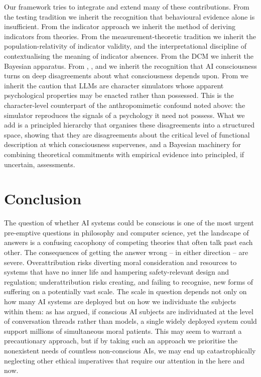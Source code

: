 \documentclass[11pt, a4paper, onecolumn, gdm]{google}
\newcounter{none}
\begin{document}
Our framework tries to integrate and extend many of these contributions.
From the testing tradition we inherit the recognition that behavioural evidence alone is insufficient.
From the indicator approach \citep{butlin2023,butlin2025} we inherit the method of deriving indicators from theories.
From the measurement-theoretic tradition \citep{bayne2024,peters2026} we inherit the population-relativity of indicator validity, and the interpretational discipline of contextualising the meaning of indicator absences.
From the DCM \citep{shiller2026} we inherit the Bayesian apparatus.
From \citet{chalmers2023}, \citet{seth2024}, and \citet{block2025} we inherit the recognition that AI consciousness turns on deep disagreements about what consciousness depends upon.
From \citet{shanahan2024} we inherit the caution that LLMs are character simulators whose apparent psychological properties may be enacted rather than possessed.
This is the character-level counterpart of the anthropomimetic confound noted above: the simulator reproduces the signals of a psychology it need not possess.
What we add is a principled hierarchy that organises these disagreements into a structured space, showing that they are disagreements about the critical level of functional description at which consciousness supervenes, and a Bayesian machinery for combining theoretical commitments with empirical evidence into principled, if uncertain, assessments.

\section{Conclusion}\label{conclusion}

The question of whether AI systems could be conscious is one of the most urgent pre-emptive questions in philosophy and computer science, yet the landscape of answers is a confusing cacophony of competing theories that often talk past each other.
The consequences of getting the answer wrong -- in either direction -- are severe.
Overattribution risks diverting moral consideration and resources to systems that have no inner life and hampering safety-relevant design and regulation; underattribution risks creating, and failing to recognise, new forms of suffering on a potentially vast scale.
The scale in question depends not only on how many AI systems are deployed but on how we individuate the subjects within them: as \citet{chalmers2026} has argued, if conscious AI subjects are individuated at the level of conversation threads rather than models, a single widely deployed system could support millions of simultaneous moral patients. 
This may seem to warrant a precautionary approach, but if by taking such an approach we prioritise the nonexistent needs of countless non-conscious AIs, we may end up catastrophically neglecting other ethical imperatives that require our attention in the here and now.
\end{document}

